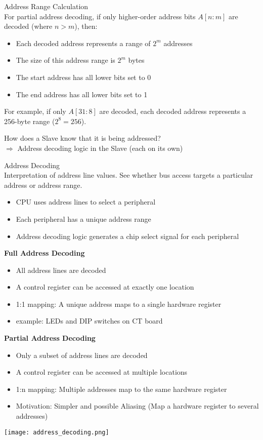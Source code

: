 \begin{theorem}{Address Range Calculation}\\
For partial address decoding, if only higher-order address bits \(A[n:m]\) are decoded (where \(n > m\)), then:
\begin{itemize}
    \item Each decoded address represents a range of \(2^m\) addresses
    \item The size of this address range is \(2^m\) bytes
    \item The start address has all lower bits set to 0
    \item The end address has all lower bits set to 1
\end{itemize}
For example, if only \(A[31:8]\) are decoded, each decoded address represents a 256-byte range (\(2^8 = 256\)).
\end{theorem}

\begin{remark}
    How does a Slave know that it is being addressed?\\
    $\Rightarrow$ Address decoding logic in the Slave (each on its own)
\end{remark}

\begin{definition}{Address Decoding}\\
    Interpretation of address line values. See whether bus access targets a particular address or address range.
    \begin{itemize}
        \item CPU uses address lines to select a peripheral
        \item Each peripheral has a unique address range
        \item Address decoding logic generates a chip select signal for each peripheral
    \end{itemize}

    \textbf{Full Address Decoding}
    \begin{itemize}
        \item All address lines are decoded
        \item A control register can be accessed at exactly one location
        \item 1:1 mapping: A unique address maps to a single hardware register
        \item example: LEDs and DIP switches on CT board
    \end{itemize}

    \textbf{Partial Address Decoding}
    \begin{itemize}
        \item Only a subset of address lines are decoded
        \item A control register can be accessed at multiple locations
        \item 1:n mapping: Multiple addresses map to the same hardware register
        \item Motivation: Simpler and possible Aliasing (Map a hardware register to several addresses)
    \end{itemize}
    \texttt{[image: address\_decoding.png]}
\end{definition}

